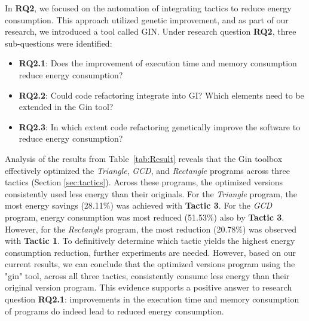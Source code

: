 \vspace{.5em}
In \textbf{RQ2}, we focused on the automation of integrating tactics to reduce energy consumption. This approach utilized genetic improvement, and as part of our research, we introduced a tool called GIN. Under research question \textbf{RQ2}, three sub-questions were identified:
\vspace{-5pt}
\begin{itemize}
    \item \textbf{RQ2.1}: Does the improvement of execution time and memory consumption reduce energy consumption?
    \vspace{-8pt}
    \item \textbf{RQ2.2}: Could code refactoring integrate into GI? Which elements need to be extended in the Gin tool?
    \vspace{-8pt}
    \item \textbf{RQ2.3}: In which extent code refactoring genetically improve the software to reduce energy consumption?
\end{itemize}
\vspace{-5pt}
Analysis of the results from Table~\ref{tab:Result} reveals that the Gin toolbox effectively optimized the \textit{Triangle}, \textit{GCD}, and \textit{Rectangle} programs across three tactics (Section \ref{sec:tactics}). Across these programs, the optimized versions consistently used less energy than their originals. For the \textit{Triangle} program, the most energy savings (28.11\%) was achieved with \textbf{Tactic 3}. For the \textit{GCD} program, energy consumption was most reduced (51.53\%) also by \textbf{Tactic 3}. However, for the \textit{Rectangle} program, the most reduction (20.78\%) was observed with \textbf{Tactic 1}. To definitively determine which tactic yields the highest energy consumption reduction, further experiments are needed. However, based on our current results, we can conclude that the optimized versions program using the "gin" tool, across all three tactics, consistently consume less energy than their original version program. This evidence supports a positive answer to research question \textbf{RQ2.1}: improvements in the execution time and memory consumption of programs do indeed lead to reduced energy consumption.

